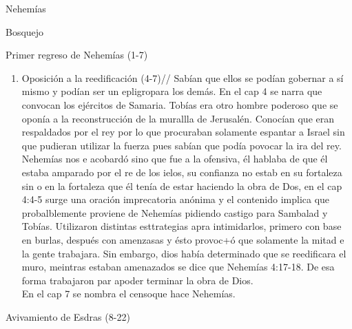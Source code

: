 \documentclass[12pt]{article}
\begin{document}
\begin{section}{Nehemías}
\begin{subsection}{Bosquejo}
\begin{subsubsection}{Primer regreso de Nehemías (1-7)}
\begin{enumerate}
					Aproximadamente a mitad del libro es que Nehemías empieza a hablar en primera érsona y es por ello que se haya cnfusión acerca de la autoría del libro, sin embargo, se considera que seguramente Esdras lo transcribió de una pergamino en donde Nehemías escribió sus memorias. Si exisitió ese documento seguramente él las consiguió y las puso en el libro. \\
					 En el cap 2, Nehemías de spués de que consigue el permiso del rey para regresar a Jersualén alienta al pueblo a reconstruir las puertas de la ciudad. No tenían el número de personas necesario para construir una muralla tan grandde, en el vs 12 se dice que lo varnes acompañaron a Nehemías y probalbmente lo guiaron para que vierna las murallas de Jersualén ya destruidas. Nehemías iba en un animal mientras que los demás iban caminando y esto se debe a que Nehemías tenía un buen rango por ser coper del rey.\\
					 Dios había inclinado el corazón de Artajerjes para que se le adorara. La recosntrucción de la muralla participó toda la gente ya que cada familia tenía un pedazo de muralla por construir.
	\item Oposición a la reedificación (4-7)//
Sabían que ellos se podían gobernar a sí mismo y podían ser un  epligropara los demás. En el cap 4 se narra que convocan los ejércitos de Samaria. Tobías era otro hombre poderoso que se oponía a la reconstrucción de la murallla de Jerusalén. Conocían que eran respaldados por el rey por lo que procuraban solamente espantar a Israel sin que pudieran utilizar la fuerza pues sabían que podía  povocar la ira del rey. Nehemías nos e acobardó sino que fue a la ofensiva, él hablaba de que él estaba amparado por el re de los ielos, su confianza no estab en su fortaleza sin o en la fortaleza que él tenía de estar haciendo la obra de Dos, en el cap 4:4-5 surge una oración imprecatoria anónima y el contenido implica que probalblemente proviene de Nehemías pidiendo castigo para Sambalad y Tobías. Utilizaron distintas esttrategias apra intimidarlos, primero con base en burlas, después con amenzasas y ésto provoc+ó que solamente la mitad e la gente trabajara. Sin embargo, dios había determinado que se reedificara el muro, meintras estaban amenazados se dice que Nehemías 4:17-18. De esa forma trabajaron par apoder terminar la obra de Dios.\\
 En el cap 7 se nombra el censoque hace Nehemías.
			\end{enumerate}
		\end{subsubsection}
		\begin{subsubsection}{Avivamiento de Esdras (8-22)}

\end{subsubsection}
\end{subsection}
\end{section}
\end{document}
